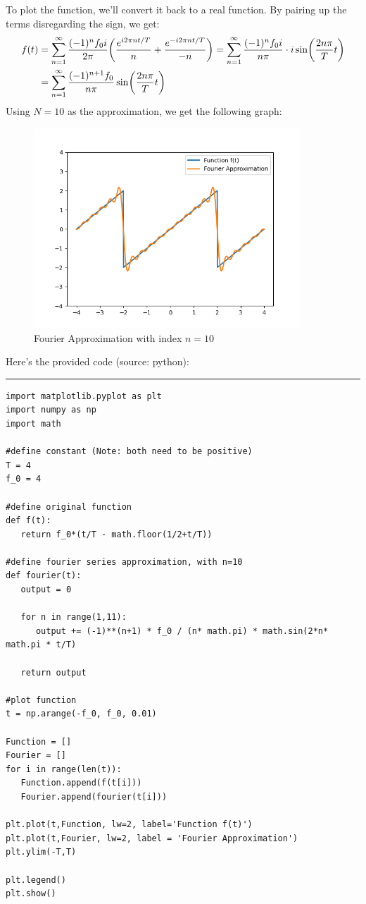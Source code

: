 \documentclass{article}
\DeclarePairedDelimiter{\paran}{(}{)}%
\begin{document}
To plot the function, we'll convert it back to a real function. By pairing up the terms disregarding the sign, we get:
\begin{align}
    f(t)&= \sum_{n=1}^{\infty}\frac{(-1)^nf_0 i}{2\pi}\paran*{\frac{e^{i2\pi nt/T}}{n}+\frac{e^{-i2\pi nt/T}}{-n}} = \sum_{n=1}^{\infty}\frac{(-1)^nf_0 i}{n\pi}\cdot i\sin\paran*{\frac{2n\pi}{T}t}\\
    &= \sum_{n=1}^{\infty}\frac{(-1)^{n+1} f_0}{n\pi}\sin\paran*{\frac{2n\pi}{T}t}
\end{align}
Using $N=10$ as the approximation, we get the following graph:
\begin{figure}[h!]
    \begin{center}
        \includegraphics[width=100mm]{phys_103_hw2_q3_b.png}
        \caption{Fourier Approximation with index $n=10$}
    \end{center}
\end{figure}

Here's the provided code (source: python):

\rule{15.24cm}{0.01mm}
\begin{verbatim}
import matplotlib.pyplot as plt
import numpy as np
import math

#define constant (Note: both need to be positive)
T = 4
f_0 = 4

#define original function
def f(t):
   return f_0*(t/T - math.floor(1/2+t/T))

#define fourier series approximation, with n=10
def fourier(t):
   output = 0

   for n in range(1,11):
      output += (-1)**(n+1) * f_0 / (n* math.pi) * math.sin(2*n* math.pi * t/T)

   return output

#plot function
t = np.arange(-f_0, f_0, 0.01)

Function = []
Fourier = []
for i in range(len(t)):
   Function.append(f(t[i]))
   Fourier.append(fourier(t[i]))

plt.plot(t,Function, lw=2, label='Function f(t)')
plt.plot(t,Fourier, lw=2, label = 'Fourier Approximation')
plt.ylim(-T,T)

plt.legend()
plt.show()
\end{verbatim}
\end{document}

